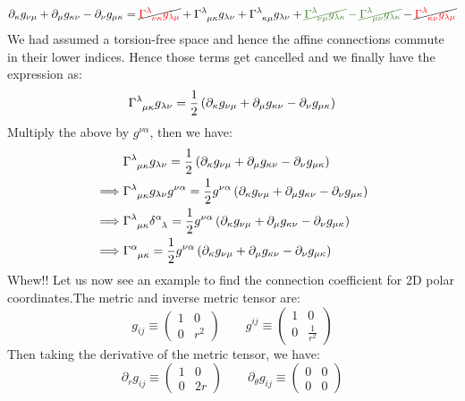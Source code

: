 \begin{align*}
\partial_\kappa g_{\nu\mu}+\partial_\mu g_{\kappa\nu}- \partial_\nu g_{\mu\kappa}=    \cancel{ \mathcolor{red}{\tensor{\Gamma}{^\lambda _{\nu \kappa }}g_{\lambda\mu}}} +\tensor{\Gamma}{^\lambda _{ \mu \kappa}}g_{\lambda\nu} +\tensor{\Gamma}{^\lambda _{\kappa \mu}}g_{\lambda\nu} +\mathcolor{OliveGreen}{\cancel{\tensor{\Gamma}{^\lambda _{\nu \mu}}g_{\lambda \kappa}}-\cancel{\tensor{\Gamma}{^\lambda _{ \mu \nu}}g_{\lambda\kappa}}} -\cancel{\mathcolor{red}{\tensor{\Gamma}{^\lambda _{\kappa \nu }}g_{\lambda\mu}}}
\end{align*}
We had assumed a torsion-free space and hence the affine connections commute in their lower indices. Hence those terms get cancelled and we finally have the expression as: 
$$\tensor{\Gamma}{^\lambda _{ \mu \kappa}}g_{\lambda\nu} = \frac{1}{2}\brac{\partial_\kappa g_{\nu\mu}+\partial_\mu g_{\kappa\nu}- \partial_\nu g_{\mu\kappa}}$$
Multiply the above by $g^{\nu\alpha}$, then we have: 
\begin{align*}
&\tensor{\Gamma}{^\lambda _{ \mu \kappa}}g_{\lambda\nu} = \frac{1}{2}\brac{\partial_\kappa g_{\nu\mu}+\partial_\mu g_{\kappa\nu}- \partial_\nu g_{\mu\kappa}}\\
\implies &\tensor{\Gamma}{^\lambda _{ \mu \kappa}}g_{\lambda\nu}g^{\nu\alpha} = \frac{1}{2}g^{\nu\alpha}\brac{\partial_\kappa g_{\nu\mu}+\partial_\mu g_{\kappa\nu}- \partial_\nu g_{\mu\kappa}}\\
\implies &\tensor{\Gamma}{^\lambda _{ \mu \kappa}}\tensor{\delta}{^\alpha _\lambda} = \frac{1}{2}g^{\nu\alpha}\brac{\partial_\kappa g_{\nu\mu}+\partial_\mu g_{\kappa\nu}- \partial_\nu g_{\mu\kappa}}\\
\implies &\tensor{\Gamma}{^\alpha _{ \mu \kappa}} = \frac{1}{2}g^{\nu\alpha}\brac{\partial_\kappa g_{\nu\mu}+\partial_\mu g_{\kappa\nu}- \partial_\nu g_{\mu\kappa}}
\end{align*}
Whew!! Let us now see an example to find the connection coefficient for 2D polar coordinates.The metric and inverse metric tensor are: 
$$g_{ij} \equiv \begin{pmatrix}
    1 & 0 \\
    0 & r^2
\end{pmatrix}\quad \quad   g^{ij} \equiv \begin{pmatrix}
    1 & 0 \\
    0 & \frac{1}{r^2}
\end{pmatrix}$$
Then taking the derivative of the metric tensor, we have: 
$$\partial_r g_{ij} \equiv \begin{pmatrix}
    1 & 0 \\
    0 & 2r
\end{pmatrix}\quad \quad   \partial_\theta g_{ij} \equiv \begin{pmatrix}
    0 & 0 \\
    0 & 0
\end{pmatrix}$$

